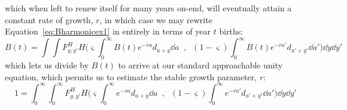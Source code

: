 which when left to renew itself for many years on-end, will eventually attain a
constant rate of growth, $r$, in which case we may rewrite
Equation~\eqref{eq:Bharmonicex1} in entirely in terms of year $t$ births:
 \begin{equation}
 \label{eq:Bharmonicex1}
 B(t) = \int \int F_{y,y'}^H H\Bigg(\varsigma \int _0^\infty
 B(t)e^{-ra}d_{a+y}\dd a\;\;,\;\; (1-\varsigma) \int _0^\infty
 B(t)e^{-ra'}d_{a'+y'} \dd a'\Bigg) \dd y \dd y'
 \end{equation}
which lets us divide by $B(t)$ to arrive at our standard approachable unity
equation, which permits us to estimate the stable growth parameter, $r$:
 \begin{equation}
 \label{eq:exMeanUnity}
 1 = \int_0^\infty \int_0^\infty F_{y,y'}^H H\Bigg(\varsigma \int _0^\infty
 e^{-ra}d_{a+y}\dd a\;\;,\;\; (1-\varsigma) \int _0^\infty
 e^{-ra'}d_{a'+y'} \dd a'\Bigg) \dd y \dd y'
 \end{equation}

 \FloatBarrier
